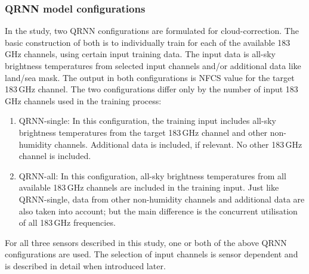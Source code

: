 \documentclass[amt, manuscript]{copernicus}
\begin{document}
\subsubsection{QRNN model configurations}
%
\label{sec:QRNN_configuration}
In the study, two QRNN configurations are formulated for cloud-correction. The basic construction of both is to individually train for each of the available 183\,GHz channels, using certain input training data. The input data is all-sky brightness temperatures from selected input channels and/or additional data like land/sea mask. The output in both configurations is NFCS value for the target 183\,GHz channel. The two configurations differ only by the number of input 183\,GHz channels used in the training process:

\begin{enumerate}
	\item QRNN-single: In this configuration, the training input includes all-sky brightness temperatures from the target 183\,GHz channel and other non-humidity channels. Additional data is included, if relevant. No other 183\,GHz channel is included.  
	
	\item QRNN-all: In this configuration, all-sky brightness temperatures from all available 183\,GHz channels are included in the training input. Just like QRNN-single, data from other non-humidity channels and additional data are also taken into account; but the main difference is the concurrent utilisation of all 183\,GHz frequencies.      
\end{enumerate}

For all three sensors described in this study, one or both of the above QRNN configurations are used. The selection of input channels is sensor dependent and is described in detail when introduced later.  
\end{document}
